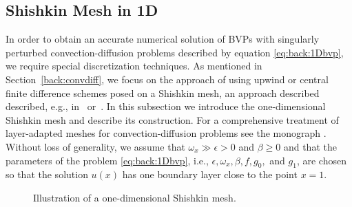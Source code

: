 \subsection{Shishkin Mesh in 1D}
\label{back:convdiff:shihs1D}

In order to obtain an accurate numerical solution of BVPs with singularly
perturbed convection-diffusion problems described by equation
\eqref{eq:back:1Dbvp}, we require special discretization techniques.
As mentioned in Section~\ref{back:convdiff}, we focus on the approach of
using upwind or central finite difference schemes posed on a Shishkin mesh, an
approach described described, e.g., in~\cite[\S~5]{Sty05}
or~\cite{FarHegMilOriShi00,KopOri10,LinSty01,MilOriShi96}. In this subsection
we introduce the one-dimensional Shishkin mesh and describe its construction.
For a comprehensive treatment of layer-adapted meshes for convection-diffusion
problems see the monograph \cite{Lin10}. Without loss of generality, we assume
that $\omega_x\gg \epsilon >0$ and $\beta\geq 0$ and that the parameters of
the problem \eqref{eq:back:1Dbvp}, i.e., $\epsilon,\omega_x,\beta,f,g_0,$ and
$g_1$, are chosen so that the solution $u(x)$ has one boundary layer close to
the point $x=1$.
%
\begin{figure}[h!]
\centering
{}
\caption{Illustration of a one-dimensional Shishkin mesh.}
\label{fig:back:shmesh1D}
\end{figure}
%

